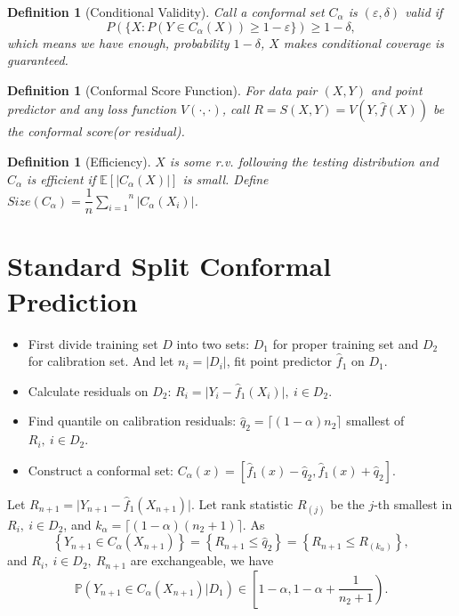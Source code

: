 \documentclass[12pt, a4paper, oneside]{article}
\newtheorem{definition}[theorem]{Definition}
\begin{document}
    \begin{definition}[Conditional Validity]\cite{vovk2012conditional}
        Call a conformal set $C_\alpha$ is $(\varepsilon,\delta)$ valid if 
        \begin{equation*}
            P(\{X:P(Y\in C_\alpha(X))\geq 1-\varepsilon\})\geq 1-\delta,
        \end{equation*}
        which means we have enough, probability $1-\delta$, $X$ makes conditional coverage is guaranteed.
    \end{definition}


    \begin{definition}[Conformal Score Function]
        For data pair $(X,Y)$ and point predictor and any loss function $V(\cdot,\cdot)$, call $R=S(X,Y)=V(Y,\hat{f}(X))$ be the conformal score(or residual).
    \end{definition}


    \begin{definition}[Efficiency]
        $X$ is some r.v. following the testing distribution and $C_\alpha$ is efficient if $\mathbb{E}\left[ |C_\alpha(X)| \right]$ is small. Define $Size(C_\alpha)=\dfrac{1}{n}\overset{n}{\underset{i=1}\sum}|C_\alpha(X_i)|$.
    \end{definition}


\section{Standard Split Conformal Prediction}
    \begin{itemize}
        \item First divide training set $D$ into two sets: $D_1$ for proper training set and $D_2$ for calibration set. And let $n_i=|D_i|$, fit point predictor $\hat{f}_1$ on $D_1$.
        \item Calculate residuals on $D_2$: $R_i=\Big|Y_i-\hat{f}_1(X_i)\Big|,\ i\in D_2$.
        \item Find quantile on calibration residuals: $\hat{q}_2=\lceil (1-\alpha)n_2\rceil$ smallest of $R_i,\ i\in D_2$.
        \item Construct a conformal set: $C_\alpha(x)=\left[ \hat{f}_1(x)-\hat{q}_2,\hat{f}_1(x)+\hat{q}_2 \right]$.
    \end{itemize}


    Let $R_{n+1}=\Big|Y_{n+1}-\hat{f}_1(X_{n+1})\Big|$. Let rank statistic $R_{(j)}$ be the $j$-th smallest in $R_i,\ i\in D_2$, and $k_\alpha=\lceil (1-\alpha)(n_2+1)\rceil$. As
    \begin{equation*}
        \left\{ Y_{n+1}\in C_\alpha(X_{n+1}) \right\}=\left\{ R_{n+1}\leq\hat{q}_2 \right\}=\left\{ R_{n+1}\leq R_{(k_\alpha)} \right\},
    \end{equation*}
    and $R_i,\ i\in D_2,\ R_{n+1}$ are exchangeable, we have
    \begin{equation*}
        \mathbb{P}\left( Y_{n+1}\in C_\alpha(X_{n+1})\Big|D_1 \right)\in\left[ 1-\alpha,1-\alpha+\dfrac{1}{n_2+1} \right).
    \end{equation*}
\end{document}
